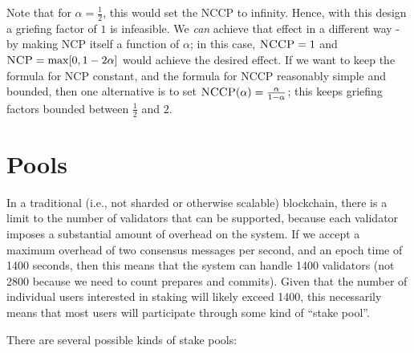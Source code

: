 \documentclass[12pt, final]{article}
\newcommand{\NCP}{\textsc{NCP}\xspace}
\newcommand{\NCCP}{\textsc{NCCP}\xspace}
\begin{document}
Note that for $\alpha = \frac{1}{2}$, this would set the \NCCP to infinity. Hence, with this design a griefing factor of $1$ is infeasible. We \emph{can} achieve that effect in a different way - by making \NCP itself a function of $\alpha$; in this case, $\NCCP = 1$ and $\NCP = \max[0, 1 - 2\alpha]$ would achieve the desired effect. If we want to keep the formula for \NCP constant, and the formula for \NCCP reasonably simple and bounded, then one alternative is to set $\NCCP(\alpha) = \frac{\alpha}{1-\alpha}$; this keeps griefing factors bounded between $\frac{1}{2}$ and $2$.

\section{Pools}

In a traditional (i.e., not sharded or otherwise scalable) blockchain, there is a limit to the number of validators that can be supported, because each validator imposes a substantial amount of overhead on the system. If we accept a maximum overhead of two consensus messages per second, and an epoch time of 1400 seconds, then this means that the system can handle 1400 validators (not 2800 because we need to count prepares and commits). Given that the number of individual users interested in staking will likely exceed 1400, this necessarily means that most users will participate through some kind of ``stake pool''.

There are several possible kinds of stake pools:
\end{document}
